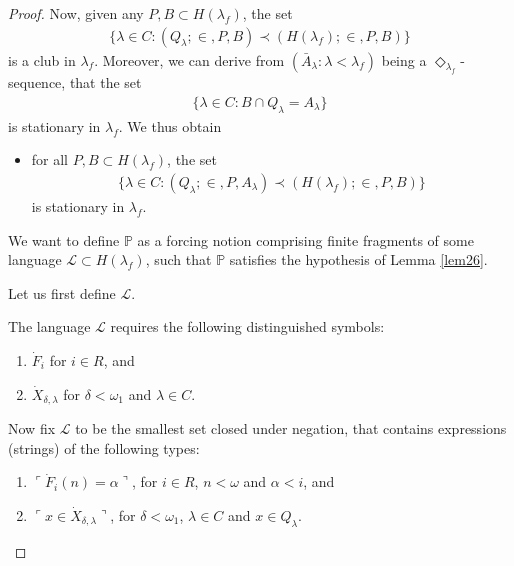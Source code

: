 \documentclass[12pt]{article}
\numberwithin{equation}{section}
\begin{document}
\begin{proof}
Now, given any $P, B \subset H(\lambda_f)$, the set
\begin{align*}
    \{\lambda \in C : (Q_{\lambda}; \in, P, B) \prec (H(\lambda_f); \in, P, B)\}
\end{align*}
is a club in $\lambda_f$. Moreover, we can derive from $(\bar{A}_{\lambda} : \lambda < \lambda_f)$ being a $\Diamond_{\lambda_f}$-sequence, that the set
\begin{align*}
    \{\lambda \in C : B \cap Q_{\lambda} = A_{\lambda}\}
\end{align*}
is stationary in $\lambda_f$. We thus obtain
\begin{itemize}[label=($\diamond$)]
    \item for all $P, B \subset H(\lambda_f)$, the set
    \begin{align*}
        \{\lambda \in C : (Q_{\lambda}; \in, P, A_{\lambda}) \prec (H(\lambda_f); \in, P, B)\}
    \end{align*}
    is stationary in $\lambda_f$.
\end{itemize}

We want to define $\mathbb{P}$ as a forcing notion comprising finite fragments of some language $\mathcal{L} \subset H(\lambda_f)$, such that $\mathbb{P}$ satisfies the hypothesis of Lemma \ref{lem26}.

Let us first define $\mathcal{L}$.

\begin{defi}\label{defl}
The language $\mathcal{L}$ requires the following distinguished symbols:
\begin{enumerate}[label=(\alph*)]
    \item $\dot{F}_i$ for $i \in R$, and
    \item $\dot{X}_{\delta, \lambda}$ for $\delta < \omega_1$ and $\lambda \in C$.
\end{enumerate}

Now fix $\mathcal{L}$ to be the smallest set closed under negation, that contains expressions (strings) of the following types:
\begin{enumerate}[label=(L\arabic*), leftmargin=40pt]
    \item $\ulcorner \dot{F}_i (n) = \alpha \urcorner$, for $i \in R$, $n < \omega$ and $\alpha < i$, and
    \item $\ulcorner x \in \dot{X}_{\delta, \lambda} \urcorner$, for $\delta < \omega_1$, $\lambda \in C$ and $x \in Q_{\lambda}$.
\end{enumerate}
\end{defi}


\end{proof}
\end{document}
